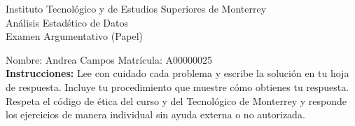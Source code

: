 \documentclass[10pt]{report}
\begin{document}
\newpage



\begin{center}
{\large Instituto Tecnol\'{o}gico y de Estudios Superiores de Monterrey \\
An\'alisis Estad\'stico de Datos } \\
Examen Argumentativo (Papel)
\end{center}

Nombre: \underline{\hspace*{.2in}}
Andrea Campos
\underline{\hspace*{.2in}} \quad Matr\'icula:\underline{\hspace*{.2in}}
A00000025
\underline{\hspace*{.2in}} \\

{\bf Instrucciones:} Lee con cuidado cada problema y escribe la soluci\'on
en tu hoja de respuesta. Incluye tu procedimiento que muestre c\'omo obtienes tu respuesta.  Respeta el c\'odigo de \'etica del curso y del Tecnol\'ogico de Monterrey y responde los ejercicios de manera individual sin ayuda externa o no autorizada.
\end{document}
